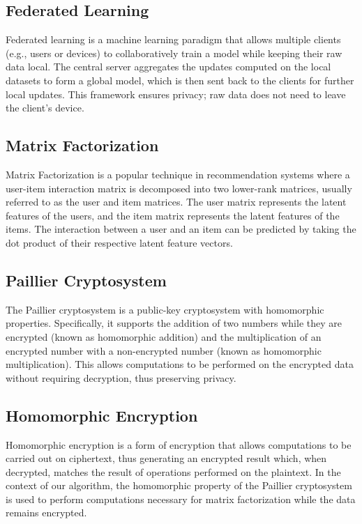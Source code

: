 \documentclass{article}
\begin{document}
\subsection{Federated Learning}
Federated learning is a machine learning paradigm that allows multiple clients (e.g., users or devices) to collaboratively train a model while keeping their raw data local. The central server aggregates the updates computed on the local datasets to form a global model, which is then sent back to the clients for further local updates. This framework ensures privacy; raw data does not need to leave the client's device.

\subsection{Matrix Factorization}
Matrix Factorization is a popular technique in recommendation systems where a user-item interaction matrix is decomposed into two lower-rank matrices, usually referred to as the user and item matrices. The user matrix represents the latent features of the users, and the item matrix represents the latent features of the items. The interaction between a user and an item can be predicted by taking the dot product of their respective latent feature vectors.

\subsection{Paillier Cryptosystem}
The Paillier cryptosystem is a public-key cryptosystem with homomorphic properties. Specifically, it supports the addition of two numbers while they are encrypted (known as homomorphic addition) and the multiplication of an encrypted number with a non-encrypted number (known as homomorphic multiplication). This allows computations to be performed on the encrypted data without requiring decryption, thus preserving privacy.

\subsection{Homomorphic Encryption}
Homomorphic encryption is a form of encryption that allows computations to be carried out on ciphertext, thus generating an encrypted result which, when decrypted, matches the result of operations performed on the plaintext. In the context of our algorithm, the homomorphic property of the Paillier cryptosystem is used to perform computations necessary for matrix factorization while the data remains encrypted.
\end{document}
